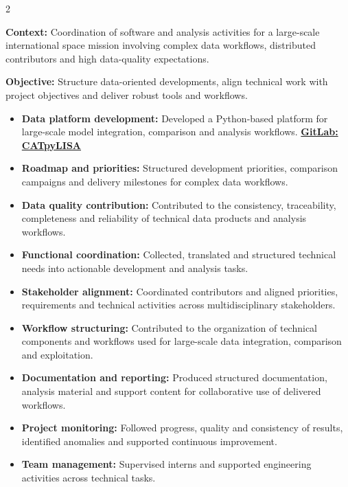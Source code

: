 \documentclass[8pt,a4paper,ragged2e,withhyper]{altacv}
\begin{document}
\begin{paracol}{2}
\divider


\textbf{Context:} Coordination of software and analysis activities for a large-scale international space mission involving complex data workflows, distributed contributors and high data-quality expectations.

\textbf{Objective:} Structure data-oriented developments, align technical work with project objectives and deliver robust tools and workflows.

\begin{itemize}
\item \textbf{Data platform development:} Developed a Python-based platform for large-scale model integration, comparison and analysis workflows. \textcolor{DarkPastelRed}{\href{https://gitlab.oca.eu/gboileau/lisa_l3_tools}{\bf GitLab: CATpyLISA}}
\item \textbf{Roadmap and priorities:} Structured development priorities, comparison campaigns and delivery milestones for complex data workflows.
\item \textbf{Data quality contribution:} Contributed to the consistency, traceability, completeness and reliability of technical data products and analysis workflows.
\item \textbf{Functional coordination:} Collected, translated and structured technical needs into actionable development and analysis tasks.
\item \textbf{Stakeholder alignment:} Coordinated contributors and aligned priorities, requirements and technical activities across multidisciplinary stakeholders.
\item \textbf{Workflow structuring:} Contributed to the organization of technical components and workflows used for large-scale data integration, comparison and exploitation.
\item \textbf{Documentation and reporting:} Produced structured documentation, analysis material and support content for collaborative use of delivered workflows.
\item \textbf{Project monitoring:} Followed progress, quality and consistency of results, identified anomalies and supported continuous improvement.
\item \textbf{Team management:} Supervised interns and supported engineering activities across technical tasks.
\end{itemize}


\end{paracol}
\end{document}
